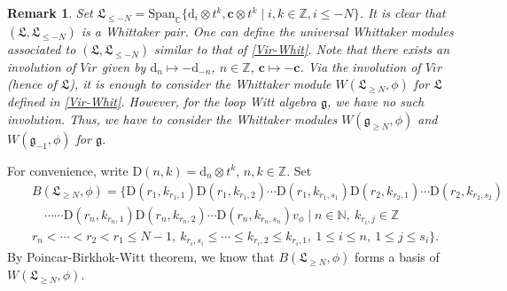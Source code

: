 \documentclass[12pt, a4paper]{amsart}
\newcommand{\fg}{\mathfrak g}
\newcommand{\C}{\mathbb{C}}
\newcommand{\N}{\mathbb N}
\newcommand{\Z}{\mathbb Z}
\newcommand{\rd}{\mathrm{d}}
\newcommand{\rD}{\mathrm{D}}
\theoremstyle{Theorem}
\theoremstyle{Theorem}
\newtheorem{remark}[thm]{Remark}
\numberwithin{equation}{section}
\begin{document}
\begin{remark}
Set $\mathfrak{L}_{\leq-N}=\text{Span}_{\C}\{\rd_{i}\otimes t^{k}, \bm{c}\otimes t^{k}\mid i,k\in\Z, i\leq-N\}$.
It is clear that $(\mathfrak{L},\mathfrak{L}_{\leq-N})$ is a Whittaker pair. One can
define the universal Whittaker modules associated to $(\mathfrak{L},\mathfrak{L}_{\leq-N})$ similar to that of
\eqref{Vir-Whit}. Note that there exists an involution of $Vir$
given by $\rd_{n}\mapsto-\rd_{-n}$, $n\in\Z$, $\bm{c}\mapsto-\bm{c}$.
Via the involution of $Vir$ (hence of $\mathfrak{L}$), it is
enough to consider the Whittaker module $W(\mathfrak{L}_{\geq N},\phi)$ for $\mathfrak{L}$ defined in \eqref{Vir-Whit}.
However, for the loop Witt algebra $\fg$, we have no such involution. Thus, we have to consider
the Whittaker modules $W(\fg_{\geq N},\phi)$ and $W(\fg_{-1},\phi)$ for $\fg$.
\end{remark}



For convenience, write $\rD(n,k)=\rd_{n}\otimes t^{k}$, $n,k\in\Z$. Set
\begin{eqnarray*}&&B(\mathfrak{L}_{\geq N},\phi)=\{\rD(r_{1},k_{r_{1},1})\rD(r_{1},k_{r_{1},2})\cdots
\rD(r_{1},k_{r_{1},s_{1}})\rD(r_{2},k_{r_{2},1})\cdots
\rD(r_{2},k_{r_{2},s_{2}})\\&&
\quad\cdots\cdots\rD(r_{n},k_{r_{n},1})\rD(r_{n},k_{r_{n},2})\cdots
\rD(r_{n},k_{r_{n},s_{n}})v_{\phi}\mid n\in\N,\ k_{r_{i},j}\in\Z\\&&
r_{n}<\cdots<r_{2}<r_{1}\leq N-1,\ k_{r_{i},s_{i}}\leq\cdots\leq k_{r_{i},2}\leq k_{r_{i},1},\
1\leq i\leq n,\ 1\leq j \leq s_{i}\}.\end{eqnarray*}
By Poincar-Birkhok-Witt theorem, we know that $B(\mathfrak{L}_{\geq N},\phi)$ forms a basis of $W(\mathfrak{L}_{\geq N},\phi)$.
\end{document}
